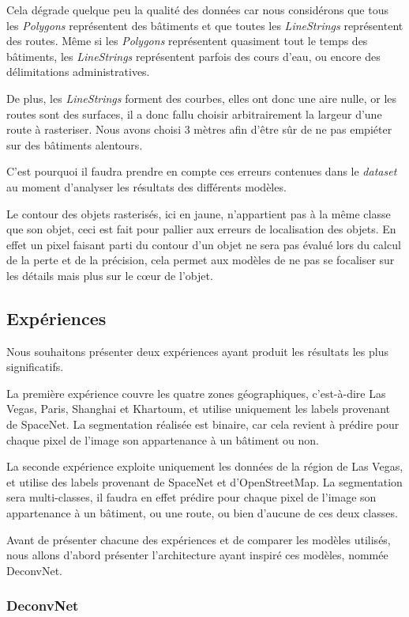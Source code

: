 \documentclass[a4paper, 11pt]{report}
\begin{document}
Cela dégrade quelque peu la qualité des données car nous considérons que tous les \emph{Polygons} représentent des bâtiments et que toutes les \emph{LineStrings} représentent des routes. Même si les \emph{Polygons} représentent quasiment tout le temps des bâtiments, les \emph{LineStrings} représentent parfois des cours d'eau, ou encore des délimitations administratives.

De plus, les \emph{LineStrings} forment des courbes, elles ont donc une aire nulle, or les routes sont des surfaces, il a donc fallu choisir arbitrairement la largeur d'une route à rasteriser. Nous avons choisi $3$ mètres afin d'être sûr de ne pas empiéter sur des bâtiments alentours.

C'est pourquoi il faudra prendre en compte ces erreurs contenues dans le \emph{dataset} au moment d'analyser les résultats des différents modèles.

Le contour des objets rasterisés, ici en jaune, n'appartient pas à la même classe que son objet, ceci est fait pour pallier aux erreurs de localisation des objets. En effet un pixel faisant parti du contour d'un objet ne sera pas évalué lors du calcul de la perte et de la précision, cela permet aux modèles de ne pas se focaliser sur les détails mais plus sur le cœur de l'objet.
\subsection{Expériences}
Nous souhaitons présenter deux expériences ayant produit les résultats les plus significatifs.

La première expérience couvre les quatre zones géographiques, c'est-à-dire Las Vegas, Paris, Shanghai et Khartoum, et utilise uniquement les labels provenant de SpaceNet.
La segmentation réalisée est binaire, car cela revient à prédire pour chaque pixel de l'image son appartenance à un bâtiment ou non.

La seconde expérience exploite uniquement les données de la région de Las Vegas,  et utilise des labels provenant de SpaceNet et d'OpenStreetMap.
La segmentation sera multi-classes, il faudra en effet prédire pour chaque pixel de l'image son appartenance à un bâtiment, ou une route, ou bien d'aucune de ces deux classes.

Avant de présenter chacune des expériences et de comparer les modèles utilisés, nous allons d'abord présenter l'architecture ayant inspiré ces modèles, nommée DeconvNet.

\subsubsection{DeconvNet}
\end{document}
